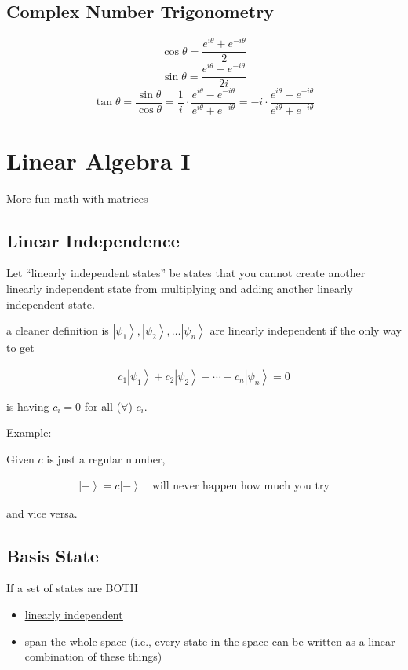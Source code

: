 \documentclass[
]{article}
\providecommand{\tightlist}{%
  \setlength{\itemsep}{0pt}\setlength{\parskip}{0pt}}
\let\oldhyperref\hyperref
\renewcommand{\hyperref}[2][]{\oldhyperref[#1]{\underline{#2}}}
\providecommand{\ket}[1]{\left\lvert #1 \right\rangle}
\begin{document}
\subsection{Complex Number Trigonometry}\label{complex-number-trigonometry}
\[
	\cos\theta = \frac{e^{i\theta} + e^{-i\theta}}{2}
\]
\[
	\sin\theta = \frac{e^{i\theta} - e^{-i\theta}}{2i}
\]
\[
	\tan\theta = \frac{\sin\theta}{\cos\theta} = \frac{1}{i}\cdot\frac{e^{i\theta} - e^{-i\theta}}{e^{i\theta} + e^{-i\theta}} = -i\cdot\frac{e^{i\theta} - e^{-i\theta}}{e^{i\theta} + e^{-i\theta}}
\]


\section{Linear Algebra I}\label{linear-algebra-i}
More fun math with matrices
\subsection{Linear Independence}\label{linear-independence}

Let ``linearly independent states'' be states that you cannot create
another linearly independent state from multiplying and adding another
linearly independent state.

a cleaner definition is \(\ket{\psi_1},\ket{\psi_2},…\ket{\psi_n}\) are
linearly independent if the only way to get

\begin{gather*}
	c_1\ket{\psi_1}+c_2\ket{\psi_2}+\cdots+c_n\ket{\psi_n}=0
\end{gather*}

is having \(c_i=0\) for all (\(\forall\)) \(c_i\).

Example:

Given \(c\) is just a regular number,

\begin{gather*}
	\ket{+}=c\ket{-}\quad\text{will never happen how much you try}
\end{gather*}

and vice versa.

\subsection{Basis State}\label{basis-states}

If a set of states are BOTH

\begin{itemize}
	\tightlist
	\item
	      \hyperref[linear-independence]{linearly
		      independent}
	\item
	      span the whole space (i.e., every state in the space can be written as
	      a linear combination of these things)
\end{itemize}
\end{document}

